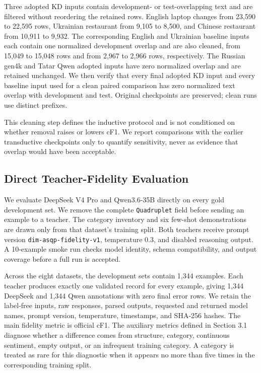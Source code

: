 Three adopted KD inputs contain development- or test-overlapping text
and are filtered without reordering the retained rows. English laptop
changes from 23,590 to 22,595 rows, Ukrainian restaurant from 9,105 to
8,500, and Chinese restaurant from 10,911 to 9,932. The corresponding
English and Ukrainian baseline inputs each contain one normalized
development overlap and are also cleaned, from 15,049 to 15,048 rows and
from 2,967 to 2,966 rows, respectively. The Russian gen4k and Tatar Qwen
adopted inputs have zero normalized overlap and are retained unchanged.
We then verify that every final adopted KD input and every baseline
input used for a clean paired comparison has zero normalized text
overlap with development and test. Original checkpoints are preserved;
clean runs use distinct prefixes.

This cleaning step defines the inductive protocol and is not conditioned
on whether removal raises or lowers cF1. We report comparisons with the
earlier transductive checkpoints only to quantify sensitivity, never as
evidence that overlap would have been acceptable.

\subsection{Direct Teacher-Fidelity
Evaluation}\label{direct-teacher-fidelity-evaluation}

We evaluate DeepSeek V4 Pro and Qwen3.6-35B directly on every gold
development set. We remove the complete \texttt{Quadruplet} field before
sending an example to a teacher. The category inventory and six few-shot
demonstrations are drawn only from that dataset's training split. Both
teachers receive prompt version \texttt{dim-asqp-fidelity-v1},
temperature 0.3, and disabled reasoning output. A 10-example smoke run
checks model identity, schema compatibility, and output coverage before
a full run is accepted.

Across the eight datasets, the development sets contain 1,344 examples.
Each teacher produces exactly one validated record for every example,
giving 1,344 DeepSeek and 1,344 Qwen annotations with zero final error
rows. We retain the label-free inputs, raw responses, parsed outputs,
requested and returned model names, prompt version, temperature,
timestamps, and SHA-256 hashes. The main fidelity metric is official
cF1. The auxiliary metrics defined in Section 3.1 diagnose whether a
difference comes from structure, category, continuous sentiment, empty
output, or an infrequent training category. A category is treated as
rare for this diagnostic when it appears no more than five times in the
corresponding training split.

